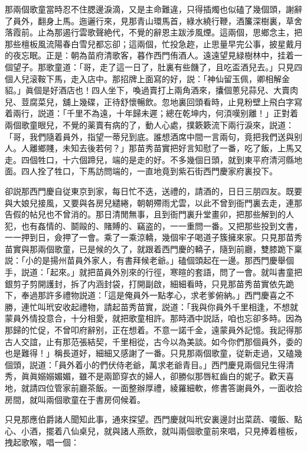 那兩個歌童當時忍不住腮邊淚滴，又是主命難違，只得插燭也似磕了幾個頭，謝辭了員外，翻身上馬。迤邐行來，見那青山環馬首，綠水繞行鞭，酒簾深樹裏，草舍落霞前。止為那遏行雲歌聲絶代，不覺的辭恩主跋涉風煙。這兩個，思鄉念主，把那些檀板風流陽春白雪兒都忘卻；這兩個，忙投急趂，止思量早完公事，披星戴月的夜忘眠。正是：朝為苗府清歌客，暮作西門侑酒人。遠遠望見緑樹林中，挂着一個望子。那歌童道：「哥，走了這一日了，肚裏有些饑了，且吃盃酒兒去。」只見四個人兒滚鞍下馬，走入店中。那招牌上面寫的好，説：「神仙留玉佩，卿相解金貂。」眞個是好酒店也！四人坐下，喚過賣打上兩角酒來，攮個蔥兒蒜兒、大賣肉兒、荳腐菜兒，舖上幾碟，正待舒懷暢飲。忽地裏回頭看時，止見粉壁上飛白字寫着兩行，説道：「千里不為遠，十年歸未遲；總在乾坤内，何湏嘆别離！」正對着兩個歌童眼兒，不覺的薬賣有病的了，動人心處，撲簌簌流下兩行淚來，説道：「哥，我們隨着員外，指望一蒂兒到底。誰想酒席中間一言兩句，竟把我們送與别人。人離鄉賤，未知去後若何？」那苗秀苗實把好言知慰了一番，吃了飯，上馬又走。四個牲口，十六個蹄兒，端的是走的好。不多幾個日頭，就到東平府清河縣地面。四人拴了牲口，下馬訪問端的，一直地竟到紫石街西門慶家府裏投下。

卻説那西門慶自従東京到家，每日忙不迭，送禮的，請酒的，日日三朋四友。既要與大娘兒接風，又要與各房兒繾綣，朝朝殢雨尤雲，以此不曾到衙門裏去走，連那告假的帖兒也不曾消的。那日清閒無事，且到衙門裏升堂畫卯，把那些解到的人犯，也有姦情的、鬬毆的、賭賻的、竊盗的，一一重問一番。又把那些投到文書，一一押到日，僉押了一會。乘了一乘涼轎，幾個牢子喝道子簇擁來家。只見那苗秀苗實與那兩個歌童，已是候的久了，就跟着西門慶的轎子，隨到前廳，雙膝跪下稟説：「小的是揚州苗員外家人，有書拜候老爺。」磕個頭起在一邊。那西門慶舉個手，説道：「起來。」就把苗員外別來的行徑，寒暄的套語，問了一會。就叫書童把銀剪子剪開護封，拆了内涵封袋，打開副啟，細細看時，只見那苗秀苗實依先跪下，奉過那許多禮物説道：「這是俺員外一點孝心，求老爹俯納。」西門慶喜之不勝，連忙叫玳安收起禮物，請起苗秀苗實，説道：「我與你員外千里相逢，不想就蒙員外情投意合，十分相愛，就把歌童相許。那時酒中説話，咱也忘卻多時。因為那歸的忙促，不曾叩府辭别，正在想着。不意一諾千金，遠蒙員外記憶。我記得那古人交誼，止有那范張結契，千里相從，古今以為美談。如今你們那個員外，委的也是難得！」稱長道好，細細又感謝了一番。只見那兩個歌童，従新走過，又磕幾個頭，説道：「員外着小的們伏侍老爺，萬求老爺青目。」西門慶見兩個兒生得清秀，眞眞嫋嫋媚媚，雖不是兩節穿衣的婦人，卻勝似那唇紅齒白的妮子。歡天喜地，就請四位管家前廳茶飯。一面整辦厚禮，綾羅細軟，修書答謝員外，一面收拾房間，就叫兩個歌童在于書房伺候着。

只見那應伯爵諸人聞知此事，通來探望。西門慶就叫玳安裏邊討出菜蔬、嗄飯、點心、小酒，擺着八仙桌兒，就與諸人燕飲，就叫兩個歌童前來唱，只見捧着檀板，拽起歌喉，唱一個：

